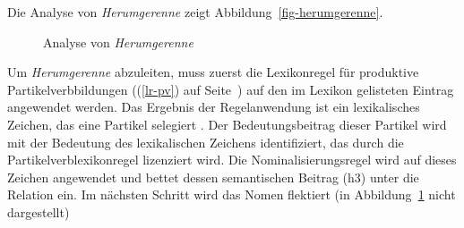%
\noindent
Die Analyse von \emph{Herumgerenne} zeigt Abbildung~\vref{fig-herumgerenne}.
\begin{figure}
\caption{Analyse von \emph{Herumgerenne}}\label{fig-herumgerenne}
\end{figure}
%
Um \emph{Herumgerenne} abzuleiten, muss zuerst die Lexikonregel für produktive Partikelverbbildungen
((\ref{lr-pv}) auf Seite~\pageref{lr-pv}) auf den im Lexikon gelisteten Eintrag  angewendet
werden. Das Ergebnis der Regelanwendung ist ein lexikalisches Zeichen,
das eine Partikel selegiert .
Der Bedeutungsbeitrag dieser Partikel  wird mit der Bedeutung
des lexikalischen Zeichens identifiziert, das durch die Partikelverblexikonregel
lizenziert wird. Die Nominalisierungsregel wird auf dieses Zeichen angewendet
und bettet dessen semantischen Beitrag (h3) unter die Relation  ein.
Im nächsten Schritt wird das Nomen flektiert (in Abbildung~\ref{fig-herumgerenne} nicht dargestellt)
